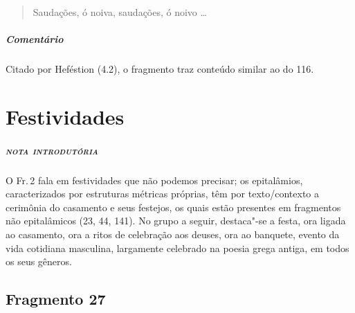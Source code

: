 \begin{verse}
Saudações, ó noiva, saudações, ó noivo \ldots{}
\end{verse}

{\paragraph{Comentário} Citado por Heféstion (4.2), o fragmento traz conteúdo similar ao do 116.}


\chapter{Festividades}

\paragraph{\textsc{nota introdutória}}
O Fr.\,2 fala em festividades que não podemos precisar; os epitalâmios,
caracterizados por estruturas métricas próprias, têm por texto/contexto a
cerimônia do casamento e seus festejos, os quais estão presentes em fragmentos não epitalâmicos (23, 44, 141). No grupo a seguir, destaca"-se a festa,
ora ligada ao casamento, ora a ritos de celebração aos deuses, ora ao banquete,
evento da vida cotidiana masculina, largamente celebrado na poesia grega
antiga, em todos os seus gêneros.

\section{Fragmento 27}

